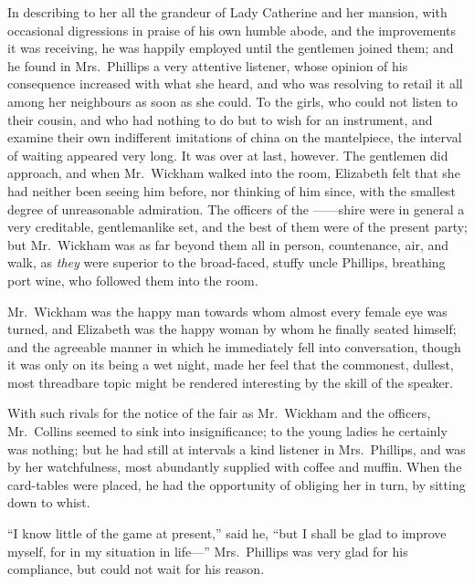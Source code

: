 \documentclass[12pt,english,oneside]{book}
\begin{document}
In describing to her all the grandeur of Lady Catherine and her mansion,
with occasional digressions in praise of his own humble abode, and
the improvements it was receiving, he was happily employed until the
gentlemen joined them; and he found in Mrs.\ Phillips a very attentive
listener, whose opinion of his consequence increased with what she
heard, and who was resolving to retail it all among her neighbours
as soon as she could. To the girls, who could not listen to their
cousin, and who had nothing to do but to wish for an instrument, and
examine their own indifferent imitations of china on the mantelpiece,
the interval of waiting appeared very long. It was over at last, however.
The gentlemen did approach, and when Mr.\ Wickham walked into the
room, Elizabeth felt that she had neither been seeing him before,
nor thinking of him since, with the smallest degree of unreasonable
admiration. The officers of the \mbox{------shire} were in general
a very creditable, gentlemanlike set, and the best of them were of
the present party; but Mr.\ Wickham was as far beyond them all in
person, countenance, air, and walk, as \textit{they} were superior
to the broad-faced, stuffy uncle Phillips, breathing port wine, who
followed them into the room.

Mr.\ Wickham was the happy man towards whom almost every female eye
was turned, and Elizabeth was the happy woman by whom he finally seated
himself; and the agreeable manner in which he immediately fell into
conversation, though it was only on its being a wet night, made her
feel that the commonest, dullest, most threadbare topic might be rendered
interesting by the skill of the speaker.

With such rivals for the notice of the fair as Mr.\ Wickham and the
officers, Mr.\ Collins seemed to sink into insignificance; to the
young ladies he certainly was nothing; but he had still at intervals
a kind listener in Mrs.\ Phillips, and was by her watchfulness, most
abundantly supplied with coffee and muffin. When the card-tables were
placed, he had the opportunity of obliging her in turn, by sitting
down to whist.

{}``I know little of the game at present,'' said he, {}``but I
shall be glad to improve myself, for in my situation in life\mbox{---}''
Mrs.\ Phillips was very glad for his compliance, but could not wait
for his reason.
\end{document}
